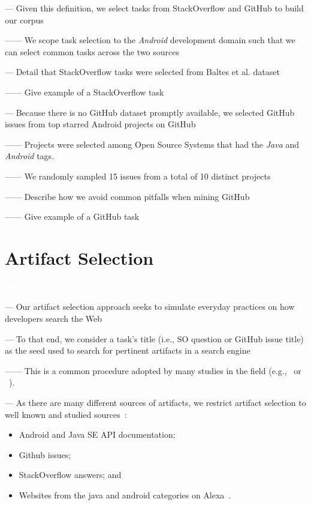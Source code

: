 \vspace{3mm}

--- Given this definition, we select tasks from StackOverflow and GitHub to build our corpus

------ We scope task selection to the \textit{Android} development domain such that we can select common tasks across the two sources \vspace{3mm}



--- Detail that StackOverflow tasks were selected from Baltes et al. dataset~\cite{baltes2019-rep}

------ Give example of a StackOverflow task \vspace{5mm}

--- Because there is no GitHub dataset promptly available, we selected GitHub issues from top starred Android projects on GitHub 

------ Projects were selected among Open Source Systems that had the \textit{Java} and \textit{Android} tags. 

------ We randomly sampled 15 issues from a total of 10 distinct projects

------ Describe how we avoid common pitfalls  when mining GitHub~\cite{kalliamvakou2014}

------ Give example of a GitHub task 

\section{Artifact Selection}
\label{cp4:corpus-artifacts}
\textcolor{white}{force ident} %


--- Our artifact selection approach seeks to simulate everyday practices on how developers search the Web~\cite{rao2020, Xia2017} \vspace{3mm}

--- To that end, we consider a task's title (i.e., SO question or GitHub issue title) as the seed used to search for pertinent artifacts in a search engine

------ This is a common procedure adopted by many studies in the field (e.g.,~\cite{Xu2017} or ~\cite{Silva2019}). \vspace{3mm}


--- As there are many different sources of artifacts, we restrict artifact selection to well known and studied sources~\cite{Starke2009,Kevic2014, Li2013}:


\begin{itemize}
    \item Android and Java SE API documentation;
    \item Github issues;
    \item StackOverflow answers; and
    \item Websites from the java and android categories on Alexa~\cite{alexa}.
\end{itemize}


